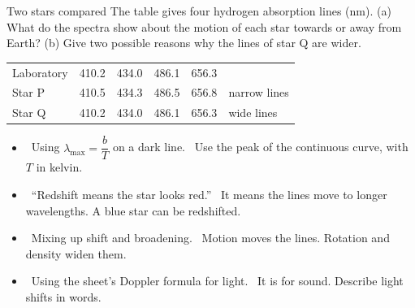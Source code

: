 \begin{workedexample}{Two stars compared}\label{ch1:we:twostars}
The table gives four hydrogen absorption lines (\si{nm}). (a) What do the spectra show about the
motion of each star towards or away from Earth? (b) Give two possible reasons why the lines of
star Q are wider.
\begin{center}\small
  \begin{tabular}{@{}lccccl@{}}
    \toprule
    Laboratory & 410.2 & 434.0 & 486.1 & 656.3 & \\
    Star P & 410.5 & 434.3 & 486.5 & 656.8 & narrow lines\\
    Star Q & 410.2 & 434.0 & 486.1 & 656.3 & wide lines\\
    \bottomrule
  \end{tabular}
\end{center}
\end{workedexample}

\begin{mistakes}
\begin{itemize}
  \item \xmark\ Using $\lambda_\mathrm{max} = \dfrac{b}{T}$ on a dark line. \cmark\ Use the peak
        of the continuous curve, with $T$ in kelvin.
  \item \xmark\ ``Redshift means the star looks red.'' \cmark\ It means the lines move to longer
        wavelengths. A blue star can be redshifted.
  \item \xmark\ Mixing up shift and broadening. \cmark\ Motion moves the lines. Rotation and
        density widen them.
  \item \xmark\ Using the sheet's Doppler formula for light. \cmark\ It is for sound. Describe
        light shifts in words.
\end{itemize}
\end{mistakes}


